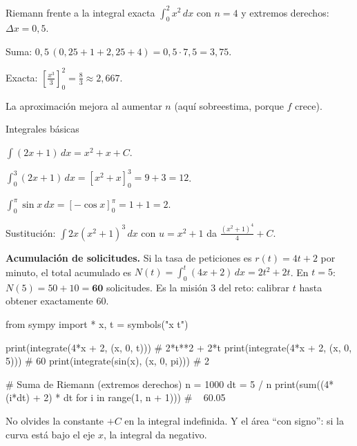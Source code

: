 \begin{tmejemplo}{Riemann frente a la integral exacta}
$\int_0^2x^2\,dx$ con $n=4$ y extremos derechos: $\Delta x=0{,}5$.
\begin{tmpasos}
\item Suma: $0{,}5\,(0{,}25+1+2{,}25+4)=0{,}5\cdot7{,}5=3{,}75$.
\item Exacta: $\left[\frac{x^3}{3}\right]_0^2=\frac83\approx2{,}667$.
\item La aproximaci\'on mejora al aumentar $n$ (aqu\'i sobreestima, porque $f$ crece).
\end{tmpasos}
\end{tmejemplo}

\begin{tmejemplo}{Integrales b\'asicas}
\begin{tmpasos}
\item $\int(2x+1)\,dx=x^2+x+C$.
\item $\int_0^3(2x+1)\,dx=[x^2+x]_0^3=9+3=12$.
\item $\int_0^\pi\sin x\,dx=[-\cos x]_0^\pi=1+1=2$.
\item Sustituci\'on: $\int2x(x^2+1)^3\,dx$ con $u=x^2+1$ da $\frac{(x^2+1)^4}{4}+C$.
\end{tmpasos}
\end{tmejemplo}

\begin{tmsistemas}
\textbf{Acumulaci\'on de solicitudes.} Si la tasa de peticiones es $r(t)=4t+2$ por minuto, el total acumulado es $N(t)=\int_0^t(4x+2)\,dx=2t^2+2t$. En $t=5$: $N(5)=50+10=\mathbf{60}$ solicitudes. Es la misi\'on 3 del reto: calibrar $t$ hasta obtener exactamente 60.
\end{tmsistemas}

\begin{tmcodigo}
from sympy import *
x, t = symbols("x t")

print(integrate(4*x + 2, (x, 0, t)))        # 2*t**2 + 2*t
print(integrate(4*x + 2, (x, 0, 5)))        # 60
print(integrate(sin(x), (x, 0, pi)))        # 2

# Suma de Riemann (extremos derechos)
n = 1000
dt = 5 / n
print(sum((4*(i*dt) + 2) * dt for i in range(1, n + 1)))  # ~ 60.05
\end{tmcodigo}

\begin{tmcuidado}No olvides la constante $+C$ en la integral indefinida. Y el \'area ``con signo'': si la curva est\'a bajo el eje $x$, la integral da negativo.\end{tmcuidado}

